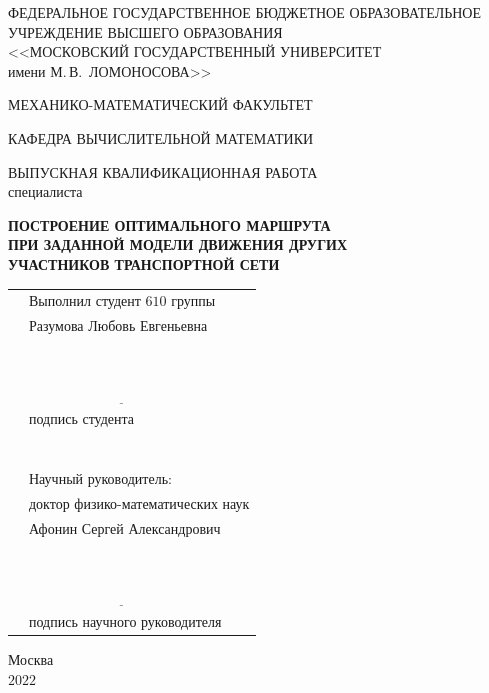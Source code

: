 \documentclass[12pt, a4paper]{article}
\begin{document}
\pagestyle{empty}

\begin{center}
	ФЕДЕРАЛЬНОЕ ГОСУДАРСТВЕННОЕ БЮДЖЕТНОЕ ОБРАЗОВАТЕЛЬНОЕ\\
	УЧРЕЖДЕНИЕ ВЫСШЕГО ОБРАЗОВАНИЯ\\
	<<МОСКОВСКИЙ ГОСУДАРСТВЕННЫЙ УНИВЕРСИТЕТ\\
	имени М.\,В.~ЛОМОНОСОВА>>
\end{center}
\vspace{4pt}
\begin{center}
	МЕХАНИКО-МАТЕМАТИЧЕСКИЙ ФАКУЛЬТЕТ
\end{center}
\vspace{4pt}
\begin{center}
	КАФЕДРА ВЫЧИСЛИТЕЛЬНОЙ МАТЕМАТИКИ
\end{center}
\vspace{1cm}
\begin{center}
	ВЫПУСКНАЯ КВАЛИФИКАЦИОННАЯ РАБОТА\\
	специалиста
\end{center}

\begin{center}
	\textbf{ПОСТРОЕНИЕ ОПТИМАЛЬНОГО МАРШРУТА \\
		ПРИ ЗАДАННОЙ МОДЕЛИ ДВИЖЕНИЯ ДРУГИХ \\
		УЧАСТНИКОВ ТРАНСПОРТНОЙ СЕТИ}
\end{center}
\vspace{1cm}
\begin{center}
	\begin{tabular}{p{9cm} l}
		& Выполнил студент $610$ группы\\
		& Разумова Любовь Евгеньевна\\
		& $\phantom{C_n^k=C_n^{n-k}}$\\
		& $\underline{\phantom{\int\limits_a^bf(x)dx=F(b)-F(a)}}$\\
		& подпись студента\\
		& $\phantom{\int\limits_f(z)dz=0}$\\
		& Научный руководитель:\\
		& доктор физико-математических наук \\
		& Афонин Сергей Александрович\\
		& $\phantom{C_n^k=C_n^{n-k}}$\\
		& $\underline{\phantom{\int\limits_a^bf(x)dx=F(b)-F(a)}}$\\
		& подпись научного руководителя\\
	\end{tabular}
\end{center}
\vspace{1cm}
\begin{center}
	Москва\\
	$2022$
\end{center}
\end{document}
